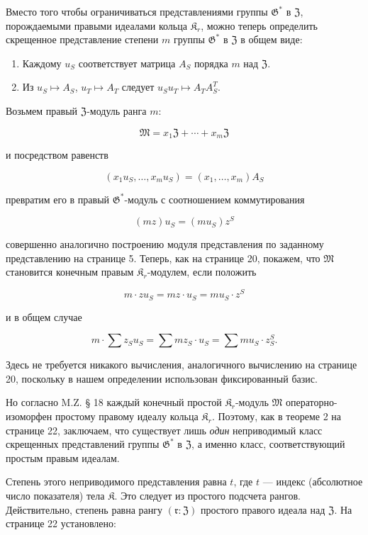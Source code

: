 \documentclass[11pt]{article}
\begin{document}
Вместо того чтобы ограничиваться представлениями группы \(\mathfrak G^*\) в \(\mathfrak Z\), порождаемыми правыми идеалами кольца \(\mathfrak K_r\), можно теперь определить скрещенное представление степени \(m\) группы \(\mathfrak G^*\) в \(\mathfrak Z\) в общем виде:

\begin{enumerate}
\item Каждому \(u_S\) соответствует матрица \(A_S\) порядка \(m\) над \(\mathfrak Z\).
\item Из \(u_S \mapsto A_S\), \(u_T \mapsto A_T\) следует \(u_Su_T \mapsto A_TA_S^T\).
\end{enumerate}

Возьмем правый \(\mathfrak Z\)-модуль ранга \(m\):

\[\mathfrak{M}=x_1\mathfrak{Z}+\cdots+x_m\mathfrak{Z}\]

и посредством равенств

\[(x_1u_S,\ldots,x_mu_S)=(x_1,\ldots,x_m)A_S\]

превратим его в правый \(\mathfrak G^*\)-модуль с соотношением коммутирования

\[(mz) u_S = (mu_S) z^S\]

совершенно аналогично построению модуля представления по заданному представлению на странице 5. Теперь, как на странице 20, покажем, что \(\mathfrak{M}\) становится конечным правым \(\mathfrak K_r\)-модулем, если положить

\[m \cdot z u_S = mz \cdot u_S = mu_S \cdot z^S\]

и в общем случае

\[m \cdot \sum z_S u_S = \sum m z_S \cdot u_S = \sum m u_S \cdot z_S^S.\]

Здесь не требуется никакого вычисления, аналогичного вычислению на странице 20, поскольку в нашем определении использован фиксированный базис.

Но согласно M.Z. § 18 каждый конечный простой \(\mathfrak K_r\)-модуль \(\mathfrak{M}\) операторно-изоморфен простому правому идеалу кольца \(\mathfrak K_r\). Поэтому, как в теореме 2 на странице 22, заключаем, что существует лишь \emph{один} неприводимый класс скрещенных представлений группы \(\mathfrak{G}^*\) в \(\mathfrak Z\), а именно класс, соответствующий простым правым идеалам.

Степень этого неприводимого представления равна \(t\), где \(t\) --- индекс (абсолютное число показателя) тела \(\mathfrak K\). Это следует из простого подсчета рангов. Действительно, степень равна рангу \((\mathfrak r:\mathfrak Z)\) простого правого идеала над \(\mathfrak Z\). На странице 22 установлено:
\end{document}
